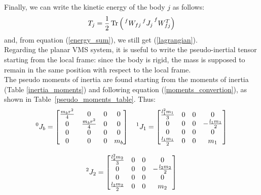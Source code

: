 \documentclass[a4paper,12pt,oneside]{report}
\DeclareMathOperator{\Tr}{Tr}
\begin{document}
Finally, we can write the kinetic energy of the body $j$ as follows:
\begin{equation}
  T_j=\frac{1}{2}\Tr{\Big(\prescript{f}{}{W_{fj}}\prescript{f}{}{J_j}\prescript{f}{}{W_{fj}^T}\Big)}
  \label{kinetic_matrix}
\end{equation}
and, from equation (\ref{energy_sum}), we still get (\ref{lagrangian}).\\

Regarding the planar VMS system, it is useful to write the pseudo-inertial tensor starting from the local frame: since the body is rigid, the mass is supposed to remain in the same position with respect to the local frame.\\
The pseudo moments of inertia are found starting from the moments of inertia (Table \ref{inertia_moments}) and following equation (\ref{moments_convertion}), as shown in Table~\ref{pseudo_moments_table}. Thus:
\begin{equation}
  \begin{array}{c}
  \prescript{0}{}{J_b}=\begin{bmatrix}
    \frac{m_br^2}{4}&0&0&0\\
    0&\frac{m_br^2}{4}&0&0\\
    0&0&0&0\\
    0&0&0&m_b
  \end{bmatrix} \quad
    \prescript{1}{}{J_1}=\begin{bmatrix}
    \frac{l_1^2m_1}{3}&0&0&0\\
    0&0&0&-\frac{l_1m_1}{2}\\
    0&0&0&0\\
    \frac{l_1m_1}{2}&0&0&m_1
  \end{bmatrix}\\
  \\
  \prescript{2}{}{J_2}=\begin{bmatrix}
    \frac{l_2^2m_2}{3}&0&0&0\\
    0&0&0&-\frac{l_2m_2}{2}\\
    0&0&0&0\\
    \frac{l_2m_2}{2}&0&0&m_2
  \end{bmatrix}
  \end{array}
\end{equation}
\end{document}
